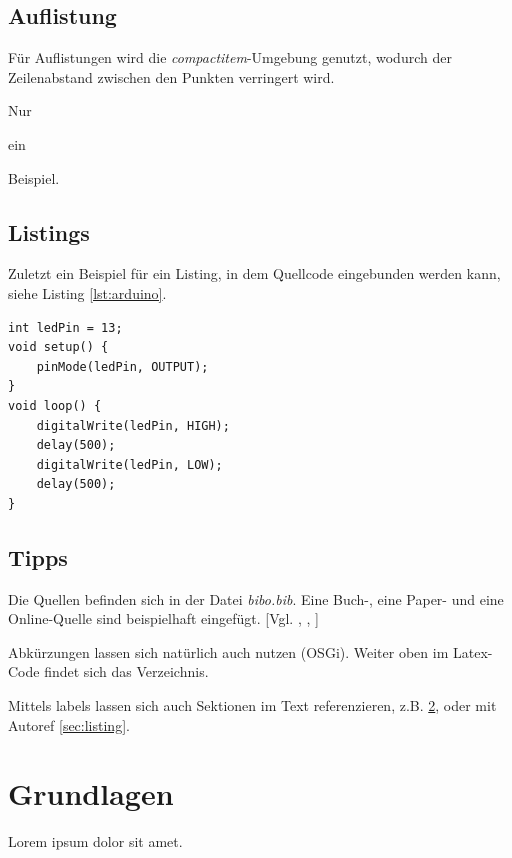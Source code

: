 \documentclass[a4paper,12pt,bibliography=totoc]{scrreprt}
\begin{document}
\section{Auflistung}
\label{sec:auflistung}
Für Auflistungen wird die \textit{compactitem}-Umgebung genutzt, wodurch der Zeilenabstand zwischen den Punkten verringert wird.

\begin{compactitem}
	\item Nur
	\item ein
	\item Beispiel.
\end{compactitem}

\section{Listings}
\label{sec:listing}
Zuletzt ein Beispiel für ein Listing, in dem Quellcode eingebunden werden kann, siehe Listing \ref{lst:arduino}.

\vspace{1em}
\begin{lstlisting}[caption=Arduino Beispielprogramm, label=lst:arduino]
int ledPin = 13;
void setup() {
    pinMode(ledPin, OUTPUT);
}
void loop() {
    digitalWrite(ledPin, HIGH);
    delay(500);
    digitalWrite(ledPin, LOW);
    delay(500);
}
\end{lstlisting}

\section{Tipps}
Die Quellen befinden sich in der Datei \textit{bibo.bib}. Eine Buch-, eine Paper- und eine Online-Quelle sind beispielhaft eingefügt. [Vgl. \cite{buch}, \cite{iotbds20}, \cite{online}]

Abkürzungen lassen sich natürlich auch nutzen (\ac{OSGi}). Weiter oben im Latex-Code findet sich das Verzeichnis.

Mittels labels lassen sich auch Sektionen im Text referenzieren, z.B. \ref{sec:listing}, oder mit Autoref \autoref{sec:listing}.

\chapter{Grundlagen}
\label{chap:grundlagen}
Lorem ipsum dolor sit amet.
\end{document}
